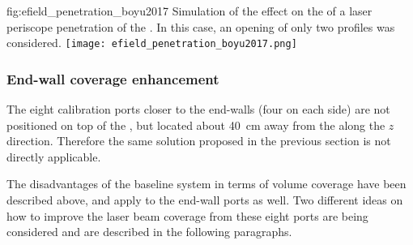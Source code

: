 \begin{dunefigure}{fig:efield_penetration_boyu2017}
{Simulation of the effect on the \efield of a laser periscope penetration of the . In this case, an opening of only two profiles was considered.}
\texttt{[image: efield\_penetration\_boyu2017.png]}
\end{dunefigure}





\subsubsection{End-wall coverage enhancement}

The eight calibration ports closer to the end-walls (four on each side) are not positioned on top of the , but located about \SI{40}{\cm} away from the  along the $z$ direction.
Therefore the same solution proposed in the previous section is not directly applicable.

The disadvantages of the baseline system in terms of volume coverage have been described above, and apply to the end-wall ports as well. Two different ideas on how to improve the laser beam coverage from these eight ports are being considered and are described in the following paragraphs.



